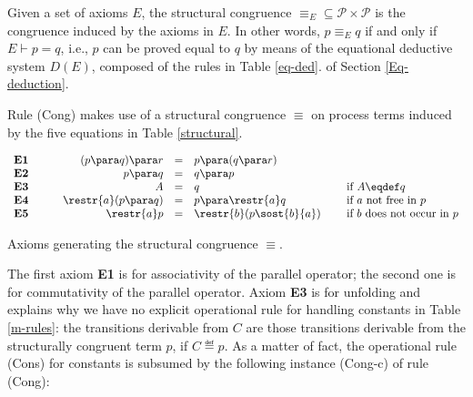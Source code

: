 Given a set of axioms $E$, the structural congruence $\equiv_E \subseteq {\mathcal P} \times {\mathcal P}$ is the 
congruence induced by the axioms in $E$. In other words, $p \equiv_E q$ if and only if $E \vdash p = q$, i.e., $p$ can be proved
equal to $q$ by means of the equational deductive system $D(E)$, composed of the rules in Table \ref{eq-ded}.
of Section \ref{Eq-deduction}.

Rule (Cong) makes use of a structural congruence $\equiv$ on process terms induced by the 
five equations in Table \ref{structural}.

\begin{table}[t]
{\renewcommand{\arraystretch}{1.8}
\normalsize{

\begin{center}

\hrulefill

$\begin{array}{llrclllrrl}
{\bf E1} &\; \; &\; \;  (p \para q) \para r & = & p \para (q \para r) \\
{\bf E2} &\; \; &\; \; p \para q & = & q \para p \\
{\bf E3} &\; \; &\; \; A & = & q & \quad \mbox{ if $A \eqdef q$}\\
{\bf E4} &\; \; &\; \; \restr{a} (p \para q)  & = & p \para \restr{a}q &  \quad \mbox{ if $a$ not free in $p$}\\
{\bf E5} &\; \; &\; \; \restr{a} p & = &  \restr{b} (p\sost{b}{a}) & \quad \mbox{ if $b$ does not occur in $p$}\\
\end{array}$


\hrulefill

\end{center}}
}
\caption{Axioms generating the structural congruence $\equiv$.}\label{structural}
\end{table}


The first axiom {\bf E1} is for associativity of the parallel operator; the second one is for commutativity
of the parallel operator. Axiom {\bf E3} is for unfolding and explains 
why we have no explicit operational rule for handling constants in Table \ref{m-rules}: the transitions derivable from $C$
are those transitions derivable from the structurally congruent term $p$, if $C \eqdef p$. As a matter
of fact, the operational rule (Cons) for constants is subsumed by the following instance (Cong-c) of rule (Cong):

